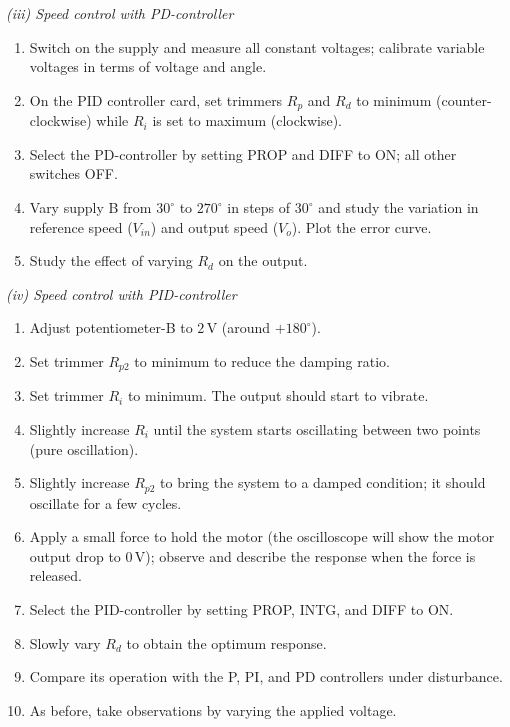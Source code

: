 \begin{procedure}
  \textit{(iii) Speed control with PD-controller}\vspace{2pt}

  \begin{enumerate}
    \item Switch on the supply and measure all constant voltages; calibrate variable voltages in terms of voltage and angle.
    \item On the PID controller card, set trimmers $R_p$ and $R_d$ to minimum (counter-clockwise) while $R_i$ is set to maximum (clockwise).
    \item Select the PD-controller by setting PROP and DIFF to ON; all other switches OFF.
    \item Vary supply B from $30^\circ$ to $270^\circ$ in steps of $30^\circ$ and study the variation in reference speed ($V_{in}$) and output speed ($V_o$). Plot the error curve.
    \item Study the effect of varying $R_d$ on the output.
  \end{enumerate}
  \vspace*{1.5em}

  \textit{(iv) Speed control with PID-controller}\vspace{2pt}

  \begin{enumerate}
    \item Adjust potentiometer-B to $2\,\text{V}$ (around $+180^\circ$).
    \item Set trimmer $R_{p2}$ to minimum to reduce the damping ratio.
    \item Set trimmer $R_i$ to minimum. The output should start to vibrate.
    \item Slightly increase $R_i$ until the system starts oscillating between two points (pure oscillation).
    \item Slightly increase $R_{p2}$ to bring the system to a damped condition; it should oscillate for a few cycles.
    \item Apply a small force to hold the motor (the oscilloscope will show the motor output drop to 0\,V); observe and describe the response when the force is released.
    \item Select the PID-controller by setting PROP, INTG, and DIFF to ON.
    \item Slowly vary $R_d$ to obtain the optimum response.
    \item Compare its operation with the P, PI, and PD controllers under disturbance.
    \item As before, take observations by varying the applied voltage.
  \end{enumerate}


\end{procedure}
